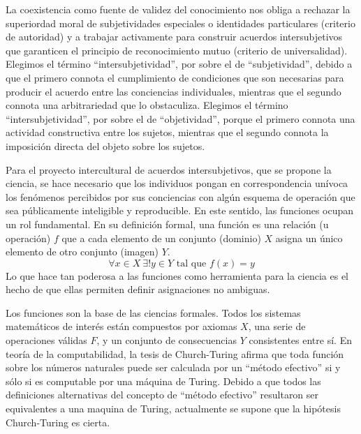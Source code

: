 \documentclass[a4paper,10pt]{book}
\theoremstyle{definition}
\begin{document}

La coexistencia como fuente de validez del conocimiento nos obliga a rechazar la superiordad moral de subjetividades especiales o identidades particulares (criterio de autoridad) y a trabajar activamente para construir acuerdos intersubjetivos que garanticen el principio de reconocimiento mutuo (criterio de universalidad).
%
Elegimos el término ``intersubjetividad'', por sobre el de ``subjetividad'', debido a que el primero connota el cumplimiento de condiciones que son necesarias para producir el acuerdo entre las conciencias individuales, mientras que el segundo connota una arbitrariedad que lo obstaculiza.
%
Elegimos el término ``intersubjetividad'', por sobre el de ``objetividad'', porque el primero connota una actividad constructiva entre los sujetos, mientras que el segundo connota la imposición directa del objeto sobre los sujetos.


Para el proyecto intercultural de acuerdos intersubjetivos, que se propone la ciencia, se hace necesario que los individuos pongan en correspondencia unívoca los fenómenos percibidos por sus conciencias con algún esquema de operación que sea públicamente inteligible y reproducible.
% 
En este sentido, las funciones ocupan un rol fundamental.
%
En su definición formal, una función es una relación (u operación) $f$ que a cada elemento de un conjunto (dominio) $X$ asigna un único elemento de otro conjunto (imagen) $Y$.
%
\begin{equation}
 \forall x \in X \  \exists! y \in Y \text{ tal que } f(x) = y    
\end{equation}
%
Lo que hace tan poderosa a las funciones como herramienta para la ciencia es el hecho de que ellas permiten definir asignaciones no ambiguas.


Los funciones son la base de las ciencias formales.
%
Todos los sistemas matemáticos de interés están compuestos por axiomas $X$, una serie de operaciones válidas $F$, y un conjunto de consecuencias $Y$ consistentes entre sí.
%
En teoría de la computabilidad, la tesis de Church-Turing afirma que toda función sobre los números naturales puede ser calculada por un ``método efectivo'' si y sólo si es computable por una máquina de Turing.
%
Debido a que todos las definiciones alternativas del concepto  de ``método efectivo'' resultaron ser equivalentes a una maquina de Turing, actualmente se supone que la hipótesis Church-Turing es cierta.
\end{document}
